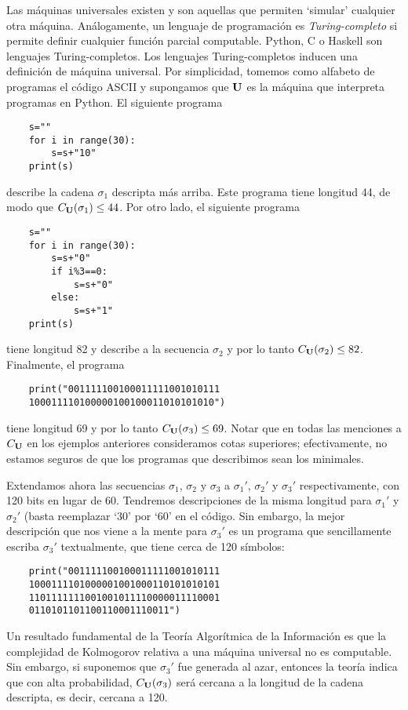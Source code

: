 Las máquinas universales existen y son aquellas que permiten `simular' cualquier otra máquina. Análogamente, un lenguaje de programación es {\em Turing-completo} si permite definir cualquier función parcial computable. Python, C o Haskell son lenguajes Turing-completos. Los lenguajes Turing-completos inducen una definición de máquina universal. Por simplicidad, tomemos como alfabeto de programas el código ASCII y supongamos que ${\bf U}$ es la máquina que interpreta programas en Python. El siguiente programa 
\begin{verbatim}
    s=""
    for i in range(30):
        s=s+"10"
    print(s)
\end{verbatim}
describe la cadena $\sigma_1$ descripta más arriba. Este programa tiene longitud 44, de modo que $C_{{\bf U}}(\sigma_1)\leq 44$. Por otro lado, el siguiente programa
\begin{verbatim}
    s=""
    for i in range(30):
        s=s+"0"
        if i%3==0:
            s=s+"0"
        else:
            s=s+"1"
    print(s)
\end{verbatim}
tiene longitud 82 y describe a la secuencia $\sigma_2$ y por lo tanto $C_{{\bf U}}(\sigma_2)\leq 82$. Finalmente, el programa
\begin{verbatim}
    print("001111100100011111001010111
    100011110100000100100011010101010")
\end{verbatim}
tiene longitud 69 y por lo tanto $C_{{\bf U}}(\sigma_3)\leq 69$. Notar que en todas las menciones a $C_{{\bf U}}$ en los ejemplos anteriores consideramos cotas superiores; efectivamente, no estamos seguros de que los programas que describimos sean los minimales.

Extendamos ahora las secuencias $\sigma_1$, $\sigma_2$ y $\sigma_3$ a $\sigma_1'$, $\sigma_2'$ y $\sigma_3'$ respectivamente, con 120 bits en lugar de 60. Tendremos descripciones de la misma longitud para $\sigma_1'$ y $\sigma_2'$ (basta reemplazar `30' por `60' en el código. Sin embargo, la mejor descripción que nos viene a la mente para $\sigma_3'$ es un programa que sencillamente escriba $\sigma_3'$ textualmente, que tiene cerca de 120 símbolos:
\begin{verbatim}
    print("001111100100011111001010111
    1000111101000001001000110101010101
    1101111111001001011110000011110001
    0110101101100110001110011")
\end{verbatim}
Un resultado fundamental de la Teoría Algorítmica de la Información es que la complejidad de Kolmogorov relativa a una máquina universal no es computable. Sin embargo, si suponemos que $\sigma_3'$ fue generada al azar, entonces la teoría indica que con alta probabilidad, $C_{{\bf U}}(\sigma_3)$ será cercana a la longitud de la cadena descripta, es decir, cercana a 120.

